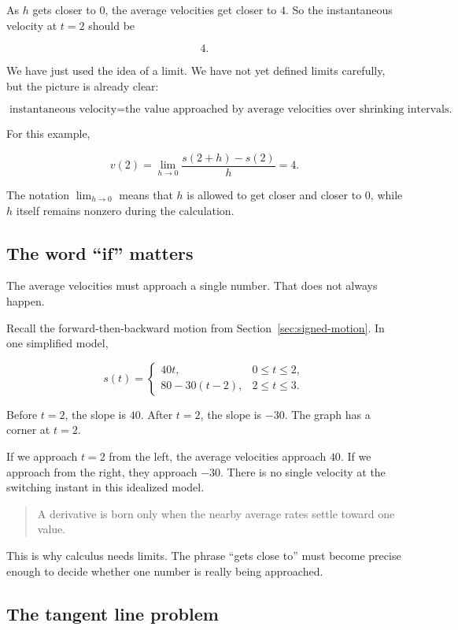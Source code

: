 As \(h\) gets closer to \(0\), the average velocities get closer to \(4\). So the instantaneous velocity at \(t=2\) should be

\[
4.
\]

We have just used the idea of a limit. We have not yet defined limits carefully, but the picture is already clear:

\[
\boxed{
\text{instantaneous velocity}
=
\text{the value approached by average velocities over shrinking intervals.}
}
\]

For this example,

\[
v(2)=\lim_{h\to 0}\frac{s(2+h)-s(2)}{h}=4.
\]

The notation \(\lim_{h\to 0}\) means that \(h\) is allowed to get closer and closer to \(0\), while \(h\) itself remains nonzero during the calculation.

\subsection{The word ``if'' matters}

The average velocities must approach a single number. That does not always happen.

Recall the forward-then-backward motion from Section~\ref{sec:signed-motion}. In one simplified model,

\[
s(t)=
\begin{cases}
40t, & 0\leq t\leq 2,\\
80-30(t-2), & 2\leq t\leq 3.
\end{cases}
\]

Before \(t=2\), the slope is \(40\). After \(t=2\), the slope is \(-30\). The graph has a corner at \(t=2\).

If we approach \(t=2\) from the left, the average velocities approach \(40\). If we approach from the right, they approach \(-30\). There is no single velocity at the switching instant in this idealized model.

\begin{quote}
A derivative is born only when the nearby average rates settle toward one value.
\end{quote}

This is why calculus needs limits. The phrase ``gets close to'' must become precise enough to decide whether one number is really being approached.

\subsection{The tangent line problem}

